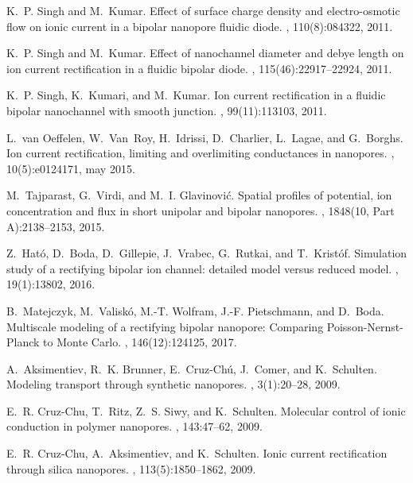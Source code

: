 \documentclass[fleqn,10pt]{SelfArx} %
\begin{document}
\begin{thebibliography}{10}
K.~P. Singh and M.~Kumar.
\newblock Effect of surface charge density and electro-osmotic flow on ionic
  current in a bipolar nanopore fluidic diode.
, 110(8):084322, 2011.

K.~P. Singh and M.~Kumar.
\newblock Effect of nanochannel diameter and debye length on ion current
  rectification in a fluidic bipolar diode.
, 115(46):22917--22924, 2011.

K.~P. Singh, K.~Kumari, and M.~Kumar.
\newblock Ion current rectification in a fluidic bipolar nanochannel with
  smooth junction.
, 99(11):113103, 2011.

L.~van Oeffelen, W.~Van~Roy, H.~Idrissi, D.~Charlier, L.~Lagae, and G.~Borghs.
\newblock Ion current rectification, limiting and overlimiting conductances in
  nanopores.
, 10(5):e0124171, may 2015.

M.~Tajparast, G.~Virdi, and M.~I. Glavinovi\'{c}.
\newblock Spatial profiles of potential, ion concentration and flux in short
  unipolar and bipolar nanopores.
, 1848(10, Part
  A):2138--2153, 2015.

Z.~Hat\'o, D.~Boda, D.~Gillepie, J.~Vrabec, G.~Rutkai, and T.~Krist\'of.
\newblock Simulation study of a rectifying bipolar ion channel: detailed model
  versus reduced model.
, 19(1):13802, 2016.

B.~Matejczyk, M.~Valisk\'o, M.-T. Wolfram, J.-F. Pietschmann, and D.~Boda.
\newblock Multiscale modeling of a rectifying bipolar nanopore: {Comparing}
  {Poisson-Nernst-Planck} to {Monte Carlo}.
, 146(12):124125, 2017.

A.~Aksimentiev, R.~K. Brunner, E.~Cruz-Ch\'u, J.~Comer, and K.~Schulten.
\newblock Modeling transport through synthetic nanopores.
, 3(1):20--28, 2009.

E.~R. Cruz-Chu, T.~Ritz, Z.~S. Siwy, and K.~Schulten.
\newblock Molecular control of ionic conduction in polymer nanopores.
, 143:47--62, 2009.

E.~R. Cruz-Chu, A.~Aksimentiev, and K.~Schulten.
\newblock Ionic current rectification through silica nanopores.
, 113(5):1850--1862, 2009.


\end{thebibliography}
\end{document}
